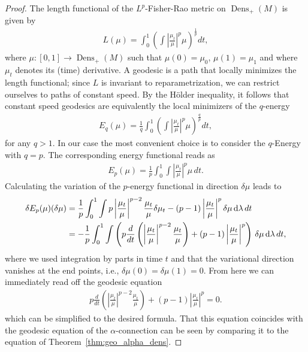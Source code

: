 \documentclass[11pt]{amsart}
\theoremstyle{definition}
\newcommand{\Abs}[1]{\left|#1\right|}
\newcommand{\dx}{\lambda}
\newcommand{\Dens}{\operatorname{Dens}_+(M)}
\newcommand{\ud}{\textup{d}}
\begin{document}
\begin{proof}
The length functional of the $L^p$-Fisher-Rao metric on $\Dens$ is given by
\begin{align*}
L(\mu)=\int_0^1 \left(\int\Abs{\frac{\mu_t}{\mu}}^p\mu\right)^{\frac{1}{p}} dt,   
\end{align*}
where $\mu: [0,1]\to \Dens$ such that $\mu(0)=\mu_0$, $\mu(1)=\mu_1$ and where $\mu_t$ denotes its (time) derivative. 
A geodesic is a path that locally minimizes the length functional; since $L$ is invariant to reparametrization, we can restrict ourselves to paths of constant speed.
By the H\"older inequality, it follows that constant speed geodesics are equivalently the local minimizers of the $q$-energy 
\begin{align*}
E_q(\mu)=\frac1q\int_0^1 \left(\int\Abs{\frac{\mu_t}{\mu}}^p\mu\right)^{\frac{q}{p}} dt,   
\end{align*}
for any $q> 1$.
In our case the most convenient choice is to consider the $q$-Energy with $q=p$. 
The corresponding energy functional reads as
\begin{align*}
E_p(\mu)=\frac1p\int_0^1 \int\Abs{\frac{\mu_t}{\mu}}^p\mu \,dt.   
\end{align*}
Calculating the variation of the $p$-energy functional in direction $\delta \mu$ leads to
\begin{equation}\label{eq:deltaE}
\begin{aligned}
\delta E_p(\mu)(\delta \mu)&=\frac{1}{p}\int_0 ^1 \int  p\Abs{\frac{\mu_t}{\mu}}^{p-2}\frac{\mu_t}{\mu}\delta \mu_t-(p-1)\Abs{\frac{\mu_t}{\mu}}^p  \delta \mu \, \ud\dx\,dt\\ 
&=-\frac{1}{p}\int_0 ^1 \int  \left( p\frac{d}{dt}\left(\Abs{\frac{\mu_{t}}{\mu}}^{p-2}\frac{\mu_t}{\mu}\right)+(p-1)\Abs{\frac{\mu_t}{\mu}}^p \right) \, \delta \mu \, \ud\dx\,dt,
\end{aligned}
\end{equation}
where we used integration by parts in time $t$ and that the variational direction vanishes at the end points, i.e., $\delta \mu(0)=\delta\mu(1)=0$.
From here we can immediately read off the geodesic equation
\begin{align*} 
p\frac{d}{dt}\left(\Abs{\frac{\mu_{t}}{\mu}}^{p-2}\frac{\mu_t}{\mu}\right)+(p-1)\Abs{\frac{\mu_t}{\mu}}^p=0.
\end{align*}
which can be simplified to the desired formula. That this equation coincides with the geodesic equation of the $\alpha$-connection can be seen by comparing it to the equation of Theorem~\ref{thm:geo_alpha_dens}. 
\end{proof}
\end{document}
